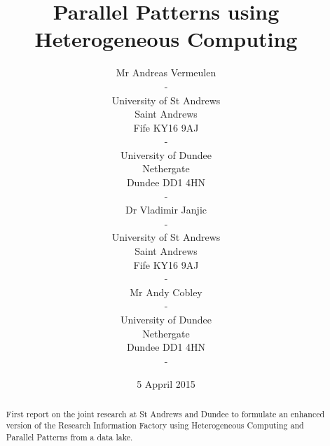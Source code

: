 \documentclass{acm_proc_article-sp}
\begin{document}
\title{Parallel Patterns using Heterogeneous Computing}
\subtitle{}
\author{
\alignauthor
Mr Andreas Vermeulen\\
\affaddr -\\
\affaddr University of St Andrews\\
\affaddr Saint Andrews\\
\affaddr Fife KY16 9AJ\\
\affaddr -\\
\affaddr University of Dundee\\
\affaddr Nethergate\\
\affaddr Dundee DD1 4HN\\
\affaddr -\\
\alignauthor
Dr Vladimir Janjic\\
\affaddr -\\
\affaddr University of St Andrews\\
\affaddr Saint Andrews\\
\affaddr Fife KY16 9AJ\\
\affaddr -\\
\alignauthor
Mr Andy Cobley\\
\affaddr -\\
\affaddr University of Dundee\\
\affaddr Nethergate\\
\affaddr Dundee DD1 4HN\\
\affaddr -\\
}
\date{5 Appril 2015}
\maketitle
\begin{abstract}
First report on the joint research at St Andrews and Dundee to formulate an enhanced version of the Research Information Factory using Heterogeneous Computing and Parallel Patterns from a data lake.
\end{abstract}



\end{document}
